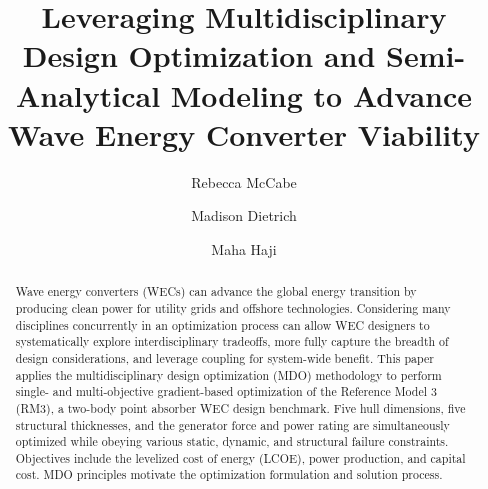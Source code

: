 \documentclass[preprint,12pt]{elsarticle}
\begin{document}

\begin{frontmatter}



\title{Leveraging Multidisciplinary Design Optimization and Semi-Analytical Modeling to Advance Wave Energy Converter Viability}

\author[MAE]{Rebecca McCabe}
\author[MAE]{Madison Dietrich}
\author[MAE,sys]{Maha Haji}




\begin{abstract}
Wave energy converters (WECs) can advance the global energy transition by producing clean power for utility grids and offshore technologies.
Considering many disciplines concurrently in an optimization process can allow WEC designers to systematically explore interdisciplinary tradeoffs, more fully capture the breadth of design considerations, and leverage coupling for system-wide benefit.
This paper applies the multidisciplinary design optimization (MDO) methodology to perform single- and multi-objective gradient-based optimization of the Reference Model 3 (RM3), a two-body point absorber WEC design benchmark.
Five hull dimensions, five structural thicknesses, and the generator force and power rating are simultaneously optimized while obeying various static, dynamic, and structural failure constraints.
Objectives include the levelized cost of energy (LCOE), power production, and capital cost.
MDO principles motivate the optimization formulation and solution process.


\end{abstract}
\end{frontmatter}
\end{document}
